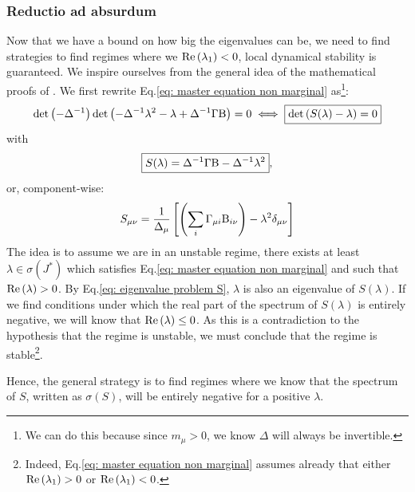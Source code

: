 \documentclass[12pt, titlepage]{report}
\begin{document}
\subsubsection{Reductio ad absurdum} \label{subsubsec: reductio ad absurdum}
Now that we have a bound on how big the eigenvalues can be, we need to find strategies to find regimes where we  $\text{Re}\left(\lambda_1\right) < 0 $, \ie local dynamical stability is guaranteed. We inspire ourselves from the general idea of the mathematical proofs of \cite{butler_stability_2018}.
We first rewrite Eq.\eqref{eq: master equation non marginal} as\footnote{We can do this because since $m_\mu > 0$, we know $\Delta$ will always be invertible.}:
\begin{equation}
\det\left(-\Delta^{-1}\right)\det\left(-\Delta^{-1}\lambda^2-\lambda+\Delta^{-1}\Gamma\text{B}\right)=0\iff \boxed{\det\left(S(\lambda)-\lambda\right)=0} \label{eq: eigenvalue problem S}
\end{equation}
with
\begin{equation}
\boxed{S(\lambda)=\Delta^{-1}\Gamma\text{B}-\Delta^{-1}\lambda^2}, \label{eq: equation stability S}
\end{equation}
or, component-wise:
\begin{equation}
S_{\mu \nu} = \frac{1}{\Delta_\mu}\left[\left(\sum_i \Gamma_{\mu i}\text{B}_{i \nu}\right) - \lambda^2 \delta_{\mu\nu}\right] \label{eq: definition S component wise}
\end{equation}
The idea is to assume we are in an unstable regime, there exists at least $\lambda \in \sigma(J^*)$ which satisfies Eq.\eqref{eq: master equation non marginal} and such that $\text{Re}\left(\lambda\right) > 0$. By Eq.\eqref{eq: eigenvalue problem S}, $\lambda$ is also an eigenvalue of $S(\lambda)$. If we find conditions under which the real part of the spectrum of $S(\lambda)$ is entirely negative, we will know that $\text{Re}\left(\lambda\right) \leq 0$. As this is a contradiction to the hypothesis that the regime is unstable, we must conclude that the regime is stable\footnote{Indeed, Eq.\eqref{eq: master equation non marginal} assumes already that either $\text{Re}\left(\lambda_1\right) >0$ or $\text{Re}\left(\lambda_1\right) < 0$.}.

Hence, the general strategy is to find regimes where we know that the spectrum of $S$, written as $\sigma(S)$, will be entirely negative for a positive $\lambda$.
\end{document}
